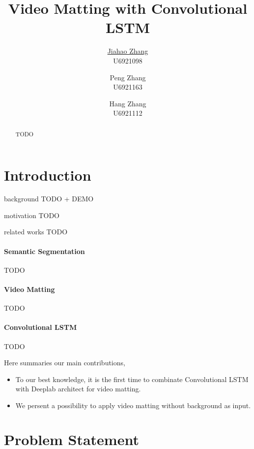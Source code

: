 \documentclass[final]{cvpr}
\begin{document}
\title{Video Matting with Convolutional LSTM}
\author{\underline{Jiahao Zhang} \\ U6921098 \and Peng Zhang \\ U6921163 \and Hang Zhang \\ U6921112}

\maketitle
\begin{abstract}
    TODO
\end{abstract}


\section{Introduction}

background TODO + DEMO

motivation TODO

related works TODO

\paragraph{Semantic Segmentation}

TODO

\paragraph{Video Matting}

TODO

\paragraph{Convolutional LSTM}

TODO

Here summaries our main contributions,

\begin{itemize}
    \item To our best knowledge, it is the first time to combinate Convolutional LSTM with Deeplab architect for video matting.
    \item We persent a possibility to apply video matting without background as input.
\end{itemize}

\section{Problem Statement}
\end{document}
